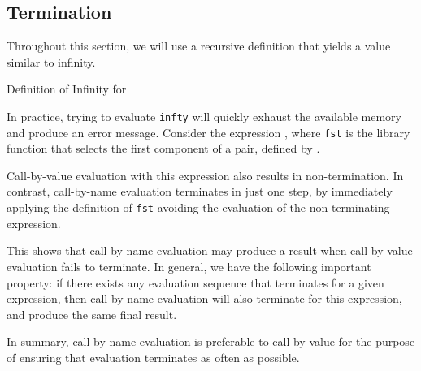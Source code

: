 \subsection{Termination}\label{subsec:Termination}
Throughout this section, we will use a recursive definition that yields a value similar to infinity.
\begin{listing}[h!tbp]
\caption{Definition of Infinity for }
\label{lst:Infty_Definition}
\end{listing}

In practice, trying to evaluate \texttt{infty} will quickly exhaust the available memory and produce an error message.
Consider the expression , where \texttt{fst} is the library function that selects the first component of a pair, defined by .

Call-by-value evaluation with this expression also results in non-termination.
In contrast, call-by-name evaluation terminates in just one step, by immediately applying the definition of \texttt{fst} avoiding the evaluation of the non-terminating expression.

This shows that call-by-name evaluation may produce a result when call-by-value evaluation fails to terminate.
In general, we have the following important property: if there exists any evaluation sequence that terminates for a given expression, then call-by-name evaluation will also terminate for this expression, and produce the same final result.

In summary, call-by-name evaluation is preferable to call-by-value for the purpose of ensuring that evaluation terminates as often as possible.

